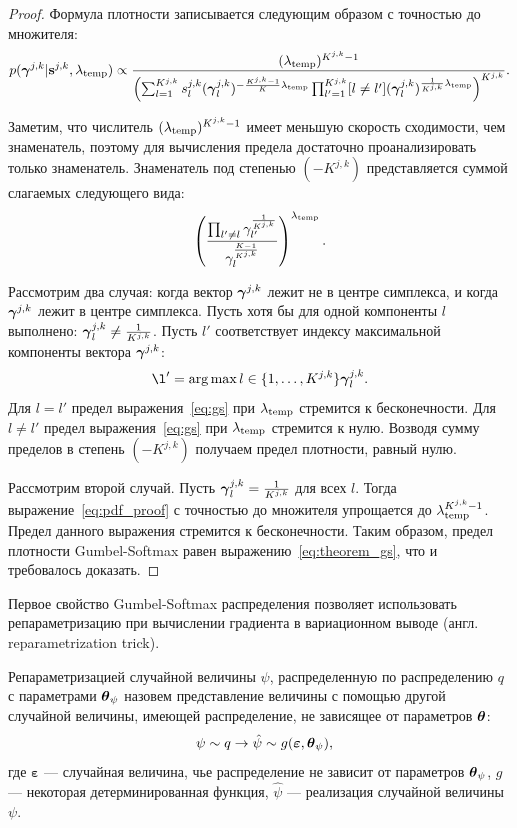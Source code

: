 \begin{proof} 
Формула плотности записывается следующим образом с точностью до множителя:
\begin{equation}
\label{eq:pdf_proof}
    p(\boldsymbol{\gamma}^{j,k}|\mathbf{s}^{j,k}, \lambda_{\text{temp}}) \propto    \frac{(\lambda_{\text{temp}})^{K^{j,k}-1}}{\left(\sum_{l=1}^{K^{j,k}} s^{j,k}_l(\boldsymbol{\gamma}^{j,k}_l)^{-\frac{K^{j,k}-1}{K}\lambda_{\text{temp}}}\prod_{l'=1}^{K^{j,k}} [l \neq l'](\boldsymbol{\gamma}_l^{j,k})^{\frac{1}{K^{j,k}}\lambda_{\text{temp}}}\right)^{K^{j,k}}}.
\end{equation}

Заметим, что числитель $(\lambda_{\text{temp}})^{K^{j,k}-1}$ имеет меньшую скорость сходимости, чем знаменатель, поэтому для вычисления предела достаточно проанализировать только знаменатель. Знаменатель под степенью $(-K^{j,k})$ представляется суммой слагаемых следующего вида: 
\begin{equation}
\label{eq:gs}
    \left(\frac{\prod_{l' \neq l} \gamma_{l'}^{\frac{1}{K^{j,k}}}}{\gamma_l^{\frac{K-1}{K^{j,k}}}}\right)^{\lambda_{\text{temp}}}.
\end{equation}

Рассмотрим два случая: когда вектор $\boldsymbol{\gamma}^{j,k}$  лежит не в центре симплекса, и когда  $\boldsymbol{\gamma}^{j,k}$ лежит в центре симплекса. 
Пусть хотя бы для одной компоненты $l$ выполнено: $\boldsymbol{\gamma}^{j,k}_l \neq \frac{1}{K^{j,k}}$. Пусть $l'$ соответствует индексу максимальной компоненты вектора $\boldsymbol{\gamma}^{j,k}$:
\[
    \l' = \argmax{l \in \{1,\dots,K^{j,k}\}} \g^{j,k}_l.
\]
Для $l=l'$ предел выражения~\eqref{eq:gs} при $\lambda_{\text{temp}}$ стремится к бесконечности. Для $l\neq l'$ предел выражения~\eqref{eq:gs} при $\lambda_{\text{temp}}$ стремится к нулю. Возводя сумму пределов в степень $(-K^{j,k})$ получаем предел плотности, равный нулю.

Рассмотрим второй случай. Пусть ${\boldsymbol{\gamma}}^{j,k}_l = \frac{1}{K^{j,k}}$ для всех $l$.
Тогда выражение~\eqref{eq:pdf_proof} с точностью до множителя упрощается до $\lambda_{\text{temp}}^{K^{j,k}-1}$. Предел данного выражения стремится к бесконечности.
Таким образом, предел плотности Gumbel-Softmax равен выражению~\eqref{eq:theorem_gs}, что и требовалось доказать.

\end{proof}


Первое свойство Gumbel-Softmax распределения позволяет использовать репараметризацию при вычислении градиента в вариационном выводе (англ. reparametrization trick). 
\begin{defin} Репараметризацией случайной величины $\psi$, распределенную по распределению $q$ с параметрами $\boldsymbol{\theta}_\psi$ назовем представление величины с помощью другой случайной величины, имеющей  распределение, не зависящее от параметров $\boldsymbol{\theta}$:
\[
    \psi \sim q \to \hat{\psi} \sim g(\boldsymbol{\varepsilon},\teta_\psi),
\]
где $\boldsymbol{\varepsilon}$ --- случайная величина, чье распределение не зависит от параметров $\boldsymbol{\theta}_\psi$, $g$ --- некоторая детерминированная функция, $\hat{\psi}$ --- реализация случайной величины $\psi$.
\end{defin}

